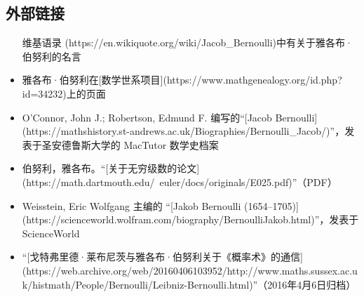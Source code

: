 \subsection{外部链接}
\begin{itemize}
\item [维基语录](https://en.wikiquote.org/wiki/Jacob_Bernoulli)中有关于雅各布·伯努利的名言
\item 雅各布·伯努利在[数学世系项目](https://www.mathgenealogy.org/id.php?id=34232)上的页面
\item O'Connor, John J.; Robertson, Edmund F. 编写的“[Jacob Bernoulli](https://mathshistory.st-andrews.ac.uk/Biographies/Bernoulli_Jacob/)”，发表于圣安德鲁斯大学的 MacTutor 数学史档案
\item 伯努利，雅各布。“[关于无穷级数的论文](https://math.dartmouth.edu/~euler/docs/originals/E025.pdf)”（PDF）
\item Weisstein, Eric Wolfgang 主编的 “[Jakob Bernoulli (1654–1705)](https://scienceworld.wolfram.com/biography/BernoulliJakob.html)”，发表于 ScienceWorld
\item “[戈特弗里德·莱布尼茨与雅各布·伯努利关于《概率术》的通信](https://web.archive.org/web/20160406103952/http://www.maths.sussex.ac.uk/histmath/People/Bernoulli/Leibniz-Bernoulli.html)”（2016年4月6日归档）
\end{itemize}